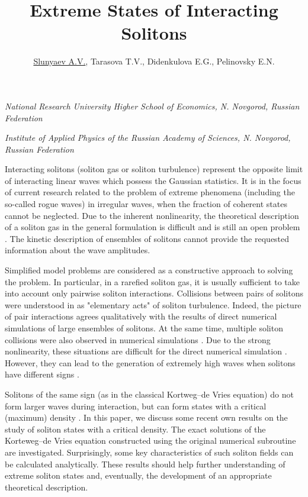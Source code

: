 \documentclass[12pt]{article}
\title{\bf\Large Extreme States of Interacting Solitons}
\author{\underline{Slunyaev A.V.}, Tarasova T.V., Didenkulova E.G., Pelinovsky E.N.}
\date{}
\begin{document}
	
\begin{center}
	\maketitle
	{\large\textit{National Research University Higher School of Economics, N. Novgorod, Russian Federation}}
	
	{\large\textit{Institute of Applied Physics of the Russian Academy of Sciences, N. Novgorod, Russian Federation}}
\end{center}

Interacting solitons (soliton gas or soliton turbulence) represent the opposite limit of interacting linear waves which possess the Gaussian statistics. It is in the focus of current research related to the problem of extreme phenomena (including the so-called rogue waves) in irregular waves, when the fraction of coherent states cannot be neglected. Due to the inherent nonlinearity, the theoretical description of a soliton gas in the general formulation is difficult and is still an open problem \cite{PelinovskyShurgalina2017}. The kinetic description of ensembles of solitons cannot provide the requested information about the wave amplitudes.

Simplified model problems are considered as a constructive approach to solving the problem. In particular, in a rarefied soliton gas, it is usually sufficient to take into account only pairwise soliton interactions. Collisions between pairs of solitons were understood in \cite{Pelinovskyetal2013} as "elementary acts" of soliton turbulence. Indeed, the picture of pair interactions agrees qualitatively with the results of direct numerical simulations of large ensembles of solitons.
%
At the same time, multiple soliton collisions were also observed in numerical simulations \cite{GelashAgafontsev2018,Didenculova2019}. Due to the strong nonlinearity, these situations are difficult for the direct numerical simulation \cite{Didenkulovaetal2019}. However, they can lead to the generation of extremely high waves when solitons have different signs \cite{SlunyaevPelinovsky2016,Slunyaev2019}.

Solitons of the same sign (as in the classical Kortweg--de Vries equation) do not form larger waves during interaction, but can form states with a critical (maximum) density \cite{PelinovskyShurgalina2017,El2016}. In this paper, we discuss some recent own results on the study of soliton states with a critical density. The exact solutions of the Korteweg--de Vries equation constructed using the original numerical subroutine are investigated. Surprisingly, some key characteristics of such soliton fields can be calculated analytically. These results should help further understanding of extreme soliton states and, eventually, the development of an appropriate theoretical description.
\end{document}
